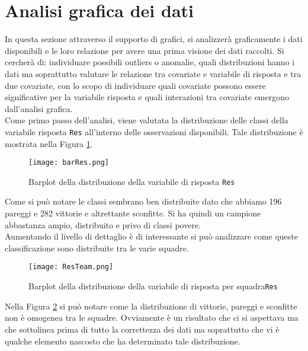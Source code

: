 \section{Analisi grafica dei dati}
In questa sezione attraverso il supporto di grafici, si analizzerà graficamente i dati disponibili e le loro relazione per avere una prima visione dei dati raccolti. Si cercherà di: individuare possibili outliers o anomalie, quali distribuzioni hanno i dati ma soprattutto valutare le relazione tra covariate e variabile di risposta e tra due covariate, con lo scopo di individuare quali covariate possono essere significative per la variabile risposta e quali interazioni tra covariate emergono dall'analisi grafica.\\

Come primo passo dell'analisi, viene valutata la distribuzione delle classi della variabile risposta \texttt{Res} all'interno delle osservazioni disponibili. Tale distribuzione è mostrata nella Figura \ref{fig:res}.

\begin{figure}[htbp]
	\begin{center}
		\texttt{[image: barRes.png]}
		\caption{Barplot della distribuzione della variabile di risposta \texttt{Res}} \label{fig:res}
	\end{center}
\end{figure}

Come si può notare le classi sembrano ben distribuite dato che abbiamo 196 pareggi e 282 vittorie e altrettante sconfitte. Si ha quindi un campione abbastanza ampio, distribuito e privo di classi povere.\\

Aumentando il livello di dettaglio è di interessante si può analizzare come queste classificazione sono distribuite tra le varie squadre.

\begin{figure}[htbp]
	\begin{center}
		\texttt{[image: ResTeam.png]}
		\caption{Barplot della distribuzione della variabile di risposta per squadra\texttt{Res}} \label{fig:team}
	\end{center}
\end{figure}

Nella Figura \ref{fig:team} si può notare come la distribuzione di vittorie, pareggi e sconfitte non è omogenea tra le squadre. Ovviamente è un risultato che ci si aspettava ma che sottolinea prima di tutto la correttezza dei dati ma soprattutto che vi è qualche elemento nascosto che ha determinato tale distribuzione.\\

